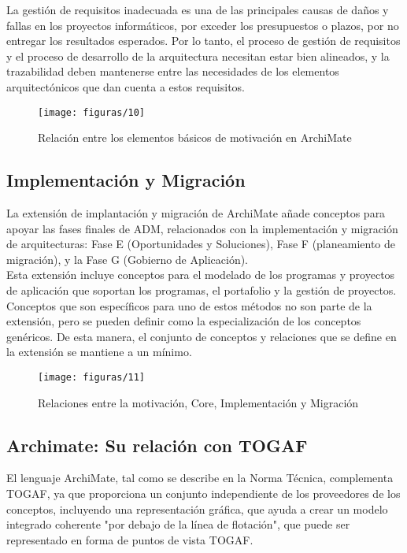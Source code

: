   La gestión de requisitos inadecuada es una de las principales causas de daños y fallas en los proyectos informáticos, por exceder los presupuestos o plazos, por no entregar los resultados esperados. Por lo tanto, el proceso de gestión de requisitos y el proceso de desarrollo de la arquitectura necesitan estar bien alineados, y la trazabilidad deben mantenerse entre las necesidades de los elementos arquitectónicos que dan cuenta a estos requisitos.
 
  \begin{figure}[H]
   	\centering
   	\texttt{[image: figuras/10]}
   	\captionsetup{width=.95\textwidth}
   	\caption{Relación entre los elementos básicos de motivación en ArchiMate}
   	\label{figura10}
  \end{figure}
  
  \subsection{Implementación y Migración}
  La extensión de implantación y migración de ArchiMate añade conceptos para apoyar las fases finales de ADM, relacionados con la implementación y migración de arquitecturas: Fase E (Oportunidades y Soluciones), Fase F (planeamiento de migración), y la Fase G (Gobierno de Aplicación). \\
  
  Esta extensión incluye conceptos para el modelado de los programas y proyectos de aplicación que soportan los programas, el portafolio y la gestión de proyectos. Conceptos que son específicos para uno de estos métodos no son parte de la extensión, pero se pueden definir como la especialización de los conceptos genéricos. De esta manera, el conjunto de conceptos y relaciones que se define en la extensión se mantiene a un mínimo.

  \begin{figure}[H]
  	\centering
   	\texttt{[image: figuras/11]}
   	\captionsetup{width=.95\textwidth}
   	\caption{Relaciones entre la motivación, Core, Implementación y Migración}
   	\label{figura11}
  \end{figure}

   \subsection{Archimate: Su relación con TOGAF}
   El lenguaje ArchiMate, tal como se describe en la Norma Técnica, complementa TOGAF, ya que proporciona un conjunto independiente de los proveedores de los conceptos, incluyendo una representación gráfica, que ayuda a crear un modelo integrado coherente "por debajo de la línea de flotación", que puede ser representado en forma de puntos de vista TOGAF. \\
   
